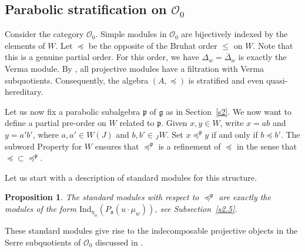 \documentclass[a4paper]{amsart}
\newtheorem{proposition}[theorem]{Proposition}
\begin{document}
\subsection{Parabolic stratification on $\mathcal{O}_0$}\label{s3.2}

Consider the category $\mathcal{O}_0$.
Simple modules in $\mathcal{O}_0$ are bijectively indexed by the 
elements of $W$. Let $\preceq$ be the opposite of the Bruhat
order $\leq$ on $W$. Note that this is a genuine partial order.
For this order, we have $\Delta_w=\overline{\Delta}_w$ is exactly
the Verma module. By \cite{BGG}, all projective modules have 
a filtration with Verma subquotients. Consequently, the algebra
$(A,\preceq)$ is stratified and even quasi-hereditary.

Let us now fix a parabolic subalgebra $\mathfrak{p}$ of $\mathfrak{g}$
as in Section~\ref{s2}. We now want to define a partial pre-order
on $W$ related to $\mathfrak{p}$. Given $x,y\in W$, write
$x=ab$ and $y=a'b'$, where $a,a'\in W(J)$ and $b,b'\in {}_JW$.
Set $x{\preceq^\mathfrak{p}}y$ if and only if $b\preceq b'$.
The subword Property for $W$ ensures that ${\preceq^\mathfrak{p}}$ 
is a refinement of $\preceq$ in the sense that 
$\preceq\subset {\preceq^\mathfrak{p}}$.

Let us start with a description of standard modules for this structure.

\begin{proposition}\label{prop-std}
The standard modules with respect to ${\preceq^\mathfrak{p}}$
are exactly the modules of the form 
$\mathrm{Ind}_{\eta_w}(P_\mathfrak{a}(u\cdot \mu_w))$,
see Subsection~\ref{s2.5}.
\end{proposition}

These standard modules give rise to the 
indecomposable projective objects in the 
Serre subquotients of $\mathcal{O}_0$ discussed in
\cite[Subsection~6.2]{CMZ}.
\end{document}
